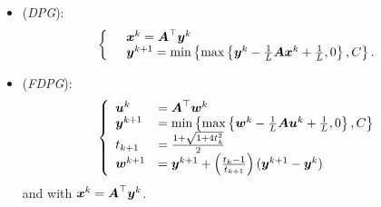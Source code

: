 \begin{itemize}
    \item (\emph{DPG}):
    \begin{align*}
    \begin{split}
    \left\{
    \begin{array}{ll}
   & \boldsymbol x^{k} = \boldsymbol A^\top \boldsymbol y^k\\
        &\boldsymbol y^{k+1} = \min\left\{\max\left\{\boldsymbol y^k-{\textstyle\frac{1}{L}}\boldsymbol A \boldsymbol x^k + {\textstyle\frac{1}{L}},0\right\}, C\right\}. \end{array}
   \right. \end{split}
    \end{align*}
    
    \item (\emph{FDPG}):
      \begin{align*}
    \begin{split}
    \left\{
    \begin{array}{ll}
         \boldsymbol u^{k} &= \boldsymbol A^\top \boldsymbol w^k\\
        \boldsymbol y^{k+1} &= \min\left\{\max\left\{\boldsymbol w^k-{\textstyle\frac{1}{L}}\boldsymbol A \boldsymbol u^k + {\textstyle\frac{1}{L}},0\right\}, C\right\}\\
        t_{k+1} &= \frac{1+\sqrt{1+4t_k^2}}{2} \\
        \boldsymbol w^{k+1} &= \boldsymbol y^{k+1} + \left( 
        \frac{t_k-1}{t_{k+1}} \right) (\boldsymbol y^{k+1}- \boldsymbol y^k)
    \end{array}
    \right.
    \end{split}
    \end{align*}
    and with  $\boldsymbol x^k = \boldsymbol A^\top \boldsymbol y^k$.
\end{itemize}
%

